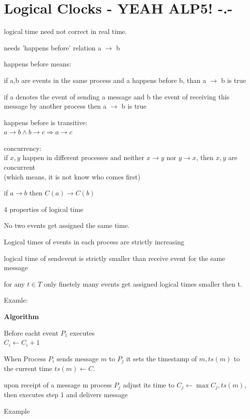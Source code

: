 \documentclass[ngerman,a4paper]{report}
\begin{document}
\section{Logical Clocks - YEAH ALP5! -.-}
\begin{compactitem}
\item logical time need not correct in real time.
\item needs 'happens before' relation a $\rightarrow$ b
\item happens before means:
\begin{compactenum}
\item if a,b are events in the same process and a happens before b, than a $\rightarrow$ b is true
\item if a denotes the event of sending a message and b the event of receiving this message by another process then a $\rightarrow$ b is true 
\end{compactenum}
\item happens before is transitive:\\
$a \rightarrow b \land b \rightarrow c \Rightarrow a \rightarrow c$
\item concurrency:\\
if $x, y$ happen in different processes and neither $x \rightarrow y$ nor $y \rightarrow x$, then $x, y$ are concurrent\\
(which means, it is not know who comes first)
\item if $a \rightarrow b$ then $C(a) \rightarrow C(b)$
\item 4 properties of logical time
\begin{compactenum}
\item No two events get assigned the same time.
\item Logical times of events in each process are strictly increasing
\item logical time of sendevent is strictly smaller than receive event for the same message
\item for any $t \in T$ only finetely many events get assigned logical times smaller then  t.
\end{compactenum}
\item Examle:

\end{compactitem}
\textbf{Algorithm}
\begin{compactenum}
\item Before eacht event $P_1$ executes\\
$C_i \leftarrow C_i + 1$
\item When Process $P_i$ sends message $m$ to $P_j$ it sets the timestamp of $m, ts(m)$ to the current time $ts(m) \leftarrow C$.
\item upon receipt of a message m process $P_j$ adjust its time to $C_j \leftarrow \max{C_j, ts(m)}$, then executes step 1 and delivers message
\end{compactenum}
Example
\end{document}
